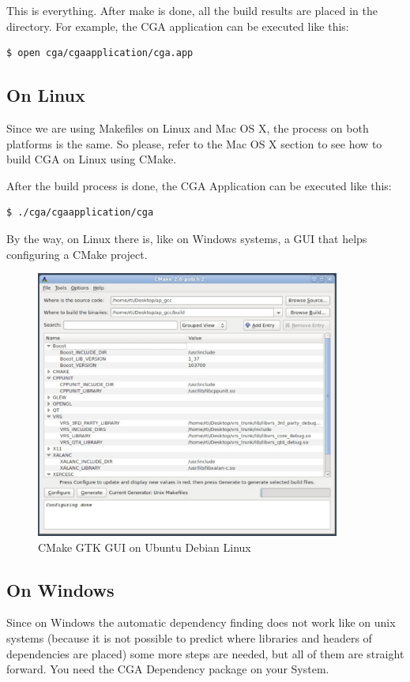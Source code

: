 This is everything. After make is done, all the build results are placed in the  directory. For example, the CGA application can be executed like this:
\begin{verbatim}
$ open cga/cgaapplication/cga.app
\end{verbatim}

\subsection{On Linux} Since we are using Makefiles on Linux and Mac OS X, the process on both platforms is the same. So please, refer to the Mac OS X section to see how to build CGA on Linux using CMake.

After the build process is done, the CGA Application can be executed like this:
\begin{verbatim}
$ ./cga/cgaapplication/cga
\end{verbatim}

By the way, on Linux there is, like on Windows systems, a GUI that helps configuring a CMake project.

\begin{figure}[ht]
\centering
\includegraphics[width=10cm]{images/cmake_gui_linux}
\caption{CMake GTK GUI on Ubuntu Debian Linux}\label{fig:cmake_gui_linux}
\end{figure}


\subsection{On Windows}
Since on Windows the automatic dependency finding does not work like on unix systems (because it is not possible to predict where libraries and headers of dependencies are placed) some more steps are needed, but all of them are straight forward. You need the CGA Dependency package on your System.

